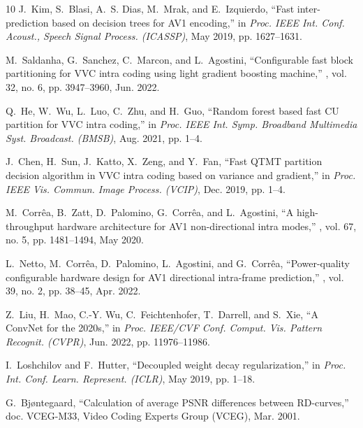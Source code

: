 \documentclass{article}
\begin{document}
\begin{thebibliography}{10}
J.~Kim, S.~Blasi, A.~S. Dias, M.~Mrak, and E.~Izquierdo,
\newblock ``Fast inter-prediction based on decision trees for {AV1} encoding,''
\newblock in {\em Proc. IEEE Int. Conf. Acoust., Speech Signal Process.
  ({ICASSP})}, May 2019, pp. 1627--1631.

M.~Saldanha, G.~Sanchez, C.~Marcon, and L.~Agostini,
\newblock ``Configurable fast block partitioning for {VVC} intra coding using
  light gradient boosting machine,''
, vol. 32, no. 6, pp.
  3947--3960, Jun. 2022.

Q.~He, W.~Wu, L.~Luo, C.~Zhu, and H.~Guo,
\newblock ``Random forest based fast {CU} partition for {VVC} intra coding,''
\newblock in {\em Proc. IEEE Int. Symp. Broadband Multimedia Syst. Broadcast.
  ({BMSB})}, Aug. 2021, pp. 1--4.

J.~Chen, H.~Sun, J.~Katto, X.~Zeng, and Y.~Fan,
\newblock ``Fast {QTMT} partition decision algorithm in {VVC} intra coding
  based on variance and gradient,''
\newblock in {\em Proc. IEEE Vis. Commun. Image Process. ({VCIP})}, Dec. 2019,
  pp. 1--4.

M.~Corr{\^e}a, B.~Zatt, D.~Palomino, G.~Corr{\^e}a, and L.~Agostini,
\newblock ``A high-throughput hardware architecture for {AV1} non-directional
  intra modes,''
, vol. 67, no. 5, pp.
  1481--1494, May 2020.

L.~Netto, M.~Corr{\^e}a, D.~Palomino, L.~Agostini, and G.~Corr{\^e}a,
\newblock ``Power-quality configurable hardware design for {AV1} directional
  intra-frame prediction,''
, vol. 39, no. 2, pp. 38--45, Apr. 2022.

Z.~Liu, H.~Mao, C.-Y. Wu, C.~Feichtenhofer, T.~Darrell, and S.~Xie,
\newblock ``A {ConvNet} for the 2020s,''
\newblock in {\em Proc. IEEE/CVF Conf. Comput. Vis. Pattern Recognit.
  ({CVPR})}, Jun. 2022, pp. 11976--11986.

I.~Loshchilov and F.~Hutter,
\newblock ``Decoupled weight decay regularization,''
\newblock in {\em Proc. Int. Conf. Learn. Represent. ({ICLR})}, May 2019, pp.
  1--18.

G.~Bj{\o}ntegaard,
\newblock ``Calculation of average {PSNR} differences between {RD}-curves,''
\newblock doc. {VCEG-M33}, Video Coding Experts Group (VCEG), Mar. 2001.


\end{thebibliography}
\end{document}
